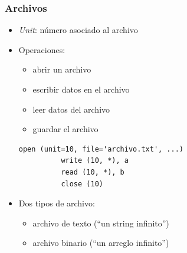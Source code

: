 \documentclass[12pt]{beamer}
\begin{document}
  \begin{frame}[fragile]
    \frametitle{Archivos}
    \begin{itemize}
      \item \emph{Unit}: número asociado al archivo
      \item Operaciones:
        \begin{itemize}
          \item abrir un archivo
          \item escribir datos en el archivo
          \item leer datos del archivo
          \item guardar el archivo
        \end{itemize}
        \pause
        \begin{lstlisting}[frame=single,gobble=6]
          open (unit=10, file='archivo.txt', ...)
          write (10, *), a
          read (10, *), b
          close (10)
        \end{lstlisting}
        \pause
      \item Dos tipos de archivo:
        \begin{itemize}
          \item archivo de texto (``un string infinito'')
          \item archivo binario (``un arreglo infinito'')
        \end{itemize}

    \end{itemize}

\end{frame}





\end{document}
